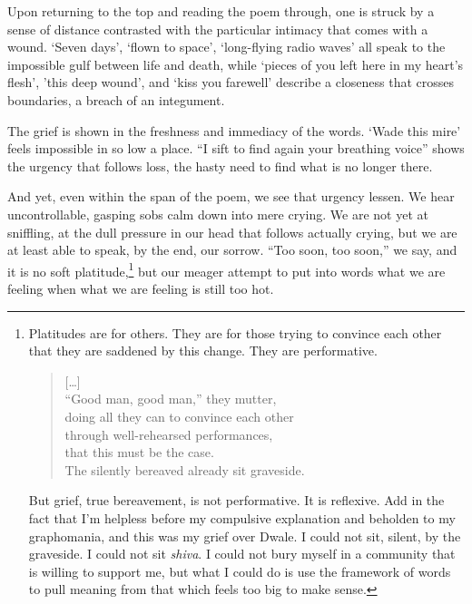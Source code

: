 \documentclass[12pt,oneside]{memoir}
\begin{document}
Upon returning to the top and reading the poem through, one is struck by a sense of distance contrasted with the particular intimacy that comes with a wound. `Seven days', `flown to space', `long-flying radio waves' all speak to the impossible gulf between life and death, while `pieces of you left here in my heart's flesh', 'this deep wound', and `kiss you farewell' describe a closeness that crosses boundaries, a breach of an integument.

The grief is shown in the freshness and immediacy of the words. `Wade this mire' feels impossible in so low a place. ``I sift to find again your breathing voice'' shows the urgency that follows loss, the hasty need to find what is no longer there.

And yet, even within the span of the poem, we see that urgency lessen. We hear uncontrollable, gasping sobs calm down into mere crying. We are not yet at sniffling, at the dull pressure in our head that follows actually crying, but we are at least able to speak, by the end, our sorrow. ``Too soon, too soon,'' we say, and it is no soft platitude,\footnote{Platitudes are for others. They are for those trying to convince each other that they are saddened by this change. They are performative.
\begin{verse}
{[\ldots]} \\
``Good man, good man,'' they mutter, \\
doing all they can to convince each other \\
through well-rehearsed performances, \\
that this must be the case. \\
The silently bereaved already sit graveside.\par
\parencite{penguins}
\end{verse}\par
But grief, true bereavement, is not performative. It is reflexive. Add in the fact that I'm helpless before my compulsive explanation and beholden to my graphomania, and this was my grief over Dwale. I could not sit, silent, by the graveside. I could not sit \emph{shiva}. I could not bury myself in a community that is willing to support me, but what I could do is use the framework of words to pull meaning from that which feels too big to make sense.} but our meager attempt to put into words what we are feeling when what we are feeling is still too hot.
\end{document}
